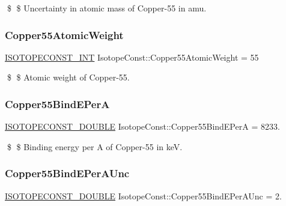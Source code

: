 \$ \$ Uncertainty in atomic mass of Copper-\/55 in amu. \mbox{\label{group___isotope_const-_copper-_cu55_gac4f002aaac8d2fd43dc48d1a3c6af646}} 
\subsubsection{\texorpdfstring{Copper55\+Atomic\+Weight}{Copper55AtomicWeight}}
{\footnotesize\ttfamily \mbox{\hyperlink{group___isotope_const-_macros_ga5f18360b3e99483a35c32d789e62621c}{I\+S\+O\+T\+O\+P\+E\+C\+O\+N\+S\+T\+\_\+\+I\+NT}} Isotope\+Const\+::\+Copper55\+Atomic\+Weight = 55}

\$ \$ Atomic weight of Copper-\/55. \mbox{\label{group___isotope_const-_copper-_cu55_gae18fc2ea00b77e26dabc8d7c0d32bf03}} 
\subsubsection{\texorpdfstring{Copper55\+Bind\+E\+PerA}{Copper55BindEPerA}}
{\footnotesize\ttfamily \mbox{\hyperlink{group___isotope_const-_macros_ga8f45a7272ce02c0b4c65c44636ed719a}{I\+S\+O\+T\+O\+P\+E\+C\+O\+N\+S\+T\+\_\+\+D\+O\+U\+B\+LE}} Isotope\+Const\+::\+Copper55\+Bind\+E\+PerA = 8233.}

\$ \$ Binding energy per A of Copper-\/55 in keV. \mbox{\label{group___isotope_const-_copper-_cu55_ga8e74a3dd561e4e019c37e417056451e1}} 
\subsubsection{\texorpdfstring{Copper55\+Bind\+E\+Per\+A\+Unc}{Copper55BindEPerAUnc}}
{\footnotesize\ttfamily \mbox{\hyperlink{group___isotope_const-_macros_ga8f45a7272ce02c0b4c65c44636ed719a}{I\+S\+O\+T\+O\+P\+E\+C\+O\+N\+S\+T\+\_\+\+D\+O\+U\+B\+LE}} Isotope\+Const\+::\+Copper55\+Bind\+E\+Per\+A\+Unc = 2.}

